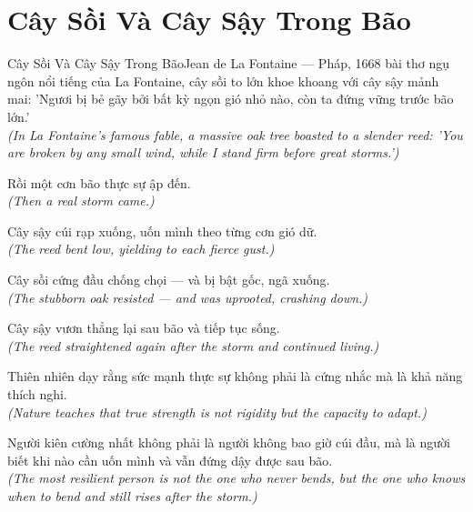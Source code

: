 \section{Cây Sồi Và Cây Sậy Trong Bão}
\begin{truyen}{Cây Sồi Và Cây Sậy Trong Bão}{Jean de La Fontaine --- Pháp, 1668}
 bài thơ ngụ ngôn nổi tiếng của La Fontaine, cây sồi to lớn khoe khoang với cây sậy mảnh mai: 'Ngươi bị bẻ gãy bởi bất kỳ ngọn gió nhỏ nào, còn ta đứng vững trước bão lớn.'\\[4pt]
\textit{(In La Fontaine's famous fable, a massive oak tree boasted to a slender reed: 'You are broken by any small wind, while I stand firm before great storms.')}

Rồi một cơn bão thực sự ập đến.\\[4pt]
\textit{(Then a real storm came.)}

Cây sậy cúi rạp xuống, uốn mình theo từng cơn gió dữ.\\[4pt]
\textit{(The reed bent low, yielding to each fierce gust.)}

Cây sồi cứng đầu chống chọi --- và bị bật gốc, ngã xuống.\\[4pt]
\textit{(The stubborn oak resisted --- and was uprooted, crashing down.)}

Cây sậy vươn thẳng lại sau bão và tiếp tục sống.\\[4pt]
\textit{(The reed straightened again after the storm and continued living.)}

Thiên nhiên dạy rằng sức mạnh thực sự không phải là cứng nhắc mà là khả năng thích nghi.\\[4pt]
\textit{(Nature teaches that true strength is not rigidity but the capacity to adapt.)}

\end{truyen}
\begin{baihoc}
  Người kiên cường nhất không phải là người không bao giờ cúi đầu, mà là người biết khi nào cần uốn mình và vẫn đứng dậy được sau bão.\\[4pt]
  \textit{(The most resilient person is not the one who never bends, but the one who knows when to bend and still rises after the storm.)}
\end{baihoc}

